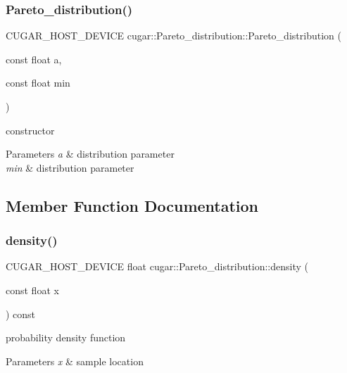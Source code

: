 \subsubsection{\texorpdfstring{Pareto\+\_\+distribution()}{Pareto\_distribution()}}
{\footnotesize\ttfamily C\+U\+G\+A\+R\+\_\+\+H\+O\+S\+T\+\_\+\+D\+E\+V\+I\+CE cugar\+::\+Pareto\+\_\+distribution\+::\+Pareto\+\_\+distribution (\begin{DoxyParamCaption}\item[{const float}]{a,  }\item[{const float}]{min }\end{DoxyParamCaption})\hspace{0.3cm}{\ttfamily [inline]}}

constructor


\begin{DoxyParams}{Parameters}
{\em a} & distribution parameter \\
\hline
{\em min} & distribution parameter \\
\hline
\end{DoxyParams}


\subsection{Member Function Documentation}
\mbox{\label{structcugar_1_1_pareto__distribution_ab4fff6aa700593597ff36de102b62d43}} 
\subsubsection{\texorpdfstring{density()}{density()}}
{\footnotesize\ttfamily C\+U\+G\+A\+R\+\_\+\+H\+O\+S\+T\+\_\+\+D\+E\+V\+I\+CE float cugar\+::\+Pareto\+\_\+distribution\+::density (\begin{DoxyParamCaption}\item[{const float}]{x }\end{DoxyParamCaption}) const\hspace{0.3cm}{\ttfamily [inline]}}

probability density function


\begin{DoxyParams}{Parameters}
{\em x} & sample location \\
\hline
\end{DoxyParams}
\mbox{\label{structcugar_1_1_pareto__distribution_ac168806c81e9638f01ba994e746ed30f}} 
